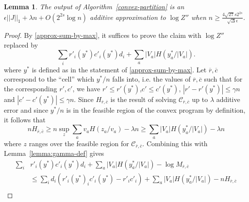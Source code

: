 \documentclass[final, 12pt]{colt2018}
\newtheorem{lemma}[theorem]{Lemma}
\theoremstyle{definition}
\theoremstyle{plain}
\begin{document}
\begin{lemma}\label{convex-partition-correctness}
The output of Algorithm~\ref{convex-partition} is an $\epsilon ||J||_{1} + \lambda n + O(2^{2s}\log n)$
additive approximation to $\log Z''$ when $n \geq \frac{4\sqrt{27}s2^{2s}}{\sqrt{\Delta} \epsilon}$.
\end{lemma}
\begin{proof}
\begin{comment}
Recall that
\[ Z'' = \sum_{y} \exp\left(\sum_i r'(y)_i c'(y)_i d_i + \sum_a |V_a| H(y_a/V_a)\right) \]
Observe that if 
$y$ is an arbitrary term in the sum and $y^*$ corresponds
to the largest term in the sum,
we know that
\begin{align}
Z'' &\ge\exp\left(\sum_i r'(y)_i c'(y)_i d_i + \sum_a |V_a| H(y_a/V_a)\right), \label{z''-below} \\
Z'' &\le n^{2^{2s}} \exp\left(\sum_i r'(y^*)_i c'(y^*)_i d_i + \sum_a |V_a|, \label{z''-above} H(y^*_a/V_a)\right).
\end{align}
We will use these bounds to relate $Z''$ to the output $M$ of Algorithm~\ref{convex-partition}.
\end{comment}
By \cref{approx-sum-by-max}, it suffices to prove the claim with $\log{Z''}$ replaced by 
\[ \sum_{i}r'_i(y^{\ast})c'_i(y^{\ast})d_{i}+\sum_{a}|V_{a}|H(y_{a}^{\ast}/|V_{a}|). \]
where $y^{*}$ is defined as in the statement of \cref{approx-sum-by-max}.
Let $\overline{r},\overline{c}$ correspond to the ``cell'' which $y^*/n$ falls into,
i.e. the values of $\overline{r},\overline{c}$ such that for the corresponding
$r',c'$, we have $r' \le r'(y^*)$,$c' \le c'(y^*)$, $|r' - r'(y^*)| \le \gamma n$
and $|c' - c'(y^*)| \le \gamma n$. Since $H_{\overline{r},\overline{c}}$ 
is the result of solving $\mathcal{C}_{\overline{r},\overline{c}}$ up to $\lambda$
additive error and since $y^*/n$ is in the feasible region of the convex program by definition, it follows that
\[ n H_{\overline{r},\overline{c}} \ge n \sup_{z} \sum_a v_a H(z_a/v_a) - \lambda n \ge \sum_a |V_a| H(y^*_a/|V_a|) - \lambda n \]
where $z$ ranges over the feasible region for $\mathcal{C}_{\overline{r},\overline{c}}$.
Combining this with Lemma~\ref{lemma:gamma-def} gives 
\begin{align*}
\sum_i &r'_i(y^*) c'_i(y^*) d_i + \sum_a |V_a| H(y^*_a/|V_a|) - \log M_{\overline{r},\overline{c}} \\
&\le \sum_i d_i (r'_i(y^*)_i c'_i(y^*) - r'_i c'_i) + \sum_a |V_a| H(y^*_a/|V_a|) - n H_{\overline{r},\overline{c}} \\

\end{align*}
\end{proof}
\end{document}
